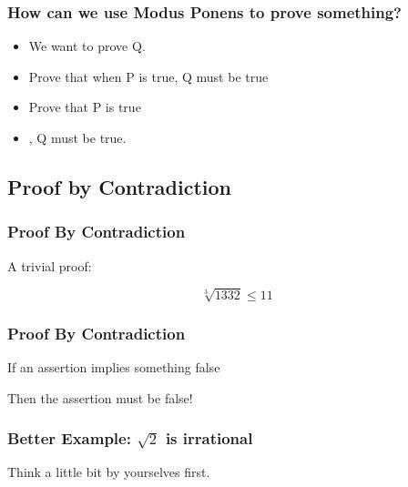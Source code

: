 \begin{frame}
  \frametitle{How can we use Modus Ponens to prove something?}
  \begin{itemize}
  \item We want to prove Q.
  \item Prove that when P is true, Q \alert{must} be true
  \item Prove that P is true
  \item {}, Q must be true.
  \end{itemize}
\end{frame}

\subsection{Proof by Contradiction}
\begin{frame}
  \frametitle{Proof By Contradiction}

  A trivial proof:

  \begin{equation*}
    \sqrt[3]{1332} \leq 11
  \end{equation*}

\end{frame}

\begin{frame}
  \frametitle{Proof By Contradiction}

  If an assertion \alert{implies something false}

  \bigskip

  Then the \alert{assertion must be false!}
\end{frame}

\begin{frame}
  \frametitle{Better Example: $\sqrt{2}$ is irrational}

  \begin{center}
    Think a little bit by yourselves first.
  \end{center}
\end{frame}

